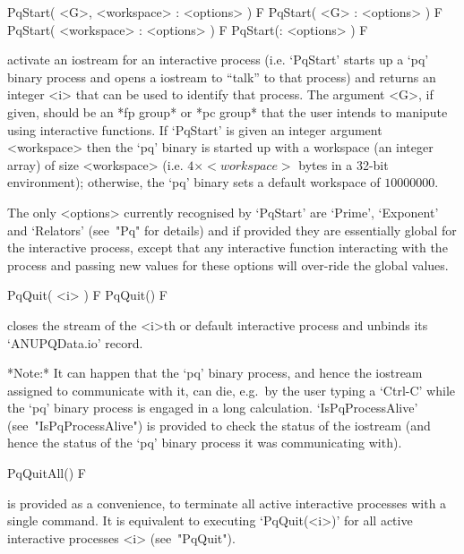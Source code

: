 
\>PqStart( <G>, <workspace> : <options> ) F
\>PqStart( <G> : <options> ) F
\>PqStart( <workspace> : <options> ) F
\>PqStart(: <options> ) F

activate an iostream for an interactive {\ANUPQ} process (i.e.  `PqStart'
starts up a `pq' binary process and opens a {\GAP} iostream  to  ``talk''
to that process) and returns an integer <i> that can be used to  identify
that process. The argument <G>, if given, should be an *fp group* or  *pc
group* that the user  intends  to  manipute  using  interactive  {\ANUPQ}
functions. If `PqStart' is given an integer argument <workspace> then the
`pq' binary is started up with a workspace (an  integer  array)  of  size
<workspace> (i.e. $4 \times <workspace>$ bytes in a 32-bit  environment);
otherwise, the `pq' binary sets a default workspace of $10000000$.

The  only  <options>  currently  recognised  by  `PqStart'  are  `Prime',
`Exponent' and `Relators' (see~"Pq" for details) and if provided they are
essentially global for the interactive {\ANUPQ} process, except that  any
interactive function interacting with the process and passing new  values
for these options will over-ride the global values.

\>PqQuit( <i> ) F
\>PqQuit() F

closes the stream of the <i>th or default  interactive  {\ANUPQ}  process
and unbinds its `ANUPQData.io' record.

*Note:*
It can happen that the `pq' binary process, and hence the {\GAP} iostream
assigned to communicate with it, can  die,  e.g.~by  the  user  typing  a
`Ctrl-C' while the `pq' binary process is engaged in a long  calculation.
`IsPqProcessAlive' (see~"IsPqProcessAlive")  is  provided  to  check  the
status of the {\GAP} iostream (and hence the status of  the  `pq'  binary
process it was communicating with).

\>PqQuitAll() F

is provided  as  a  convenience,  to  terminate  all  active  interactive
{\ANUPQ} processes with a single command. It is equivalent  to  executing
`PqQuit(<i>)'  for  all  active  interactive   {\ANUPQ}   processes   <i>
(see~"PqQuit").


